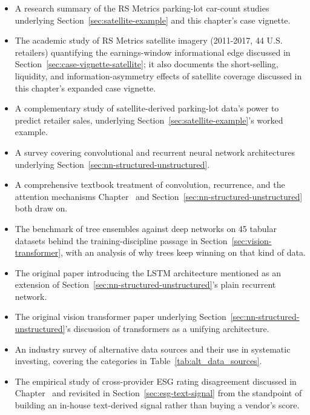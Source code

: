 \documentclass[../ai_in_finance]{subfiles}
\begin{document}
\begin{enumerate}[exercises]
\end{enumerate}


\begin{itemize}
    \item {} A research summary of the RS Metrics parking-lot car-count studies underlying Section~\ref{sec:satellite-example} and this chapter's case vignette.
    \item {} The academic study of RS Metrics satellite imagery (2011-2017, 44 U.S. retailers) quantifying the earnings-window informational edge discussed in Section~\ref{sec:case-vignette-satellite}; it also documents the short-selling, liquidity, and information-asymmetry effects of satellite coverage discussed in this chapter's expanded case vignette.
    \item {} A complementary study of satellite-derived parking-lot data's power to predict retailer sales, underlying Section~\ref{sec:satellite-example}'s worked example.
    \item {} A survey covering convolutional and recurrent neural network architectures underlying Section~\ref{sec:nn-structured-unstructured}.
    \item {} A comprehensive textbook treatment of convolution, recurrence, and the attention mechanisms Chapter~ and Section~\ref{sec:nn-structured-unstructured} both draw on.
    \item {} The benchmark of tree ensembles against deep networks on 45 tabular datasets behind the training-discipline passage in Section~\ref{sec:vision-transformer}, with an analysis of why trees keep winning on that kind of data.
    \item {} The original paper introducing the LSTM architecture mentioned as an extension of Section~\ref{sec:nn-structured-unstructured}'s plain recurrent network.
    \item {} The original vision transformer paper underlying Section~\ref{sec:nn-structured-unstructured}'s discussion of transformers as a unifying architecture.
    \item {} An industry survey of alternative data sources and their use in systematic investing, covering the categories in Table~\ref{tab:alt_data_sources}.
    \item {} The empirical study of cross-provider ESG rating disagreement discussed in Chapter~ and revisited in Section~\ref{sec:esg-text-signal} from the standpoint of building an in-house text-derived signal rather than buying a vendor's score.

\end{itemize}
\end{document}
